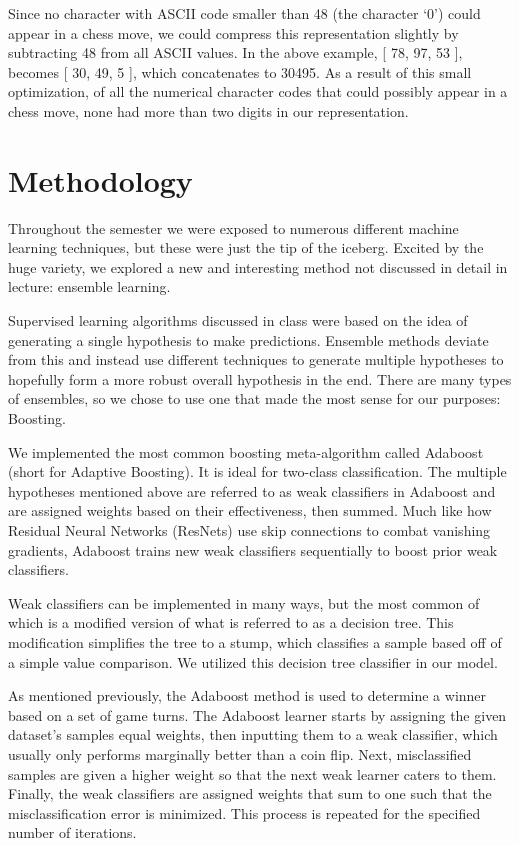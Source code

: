 \documentclass[]{interact}
\theoremstyle{plain}%
\theoremstyle{definition}
\theoremstyle{remark}
\begin{document}
Since no character with ASCII code smaller than 48 (the character ‘0’) could appear in a chess move, we could compress this representation slightly by subtracting 48 from all ASCII values. In the above example, [ 78, 97, 53 ], becomes [ 30, 49, 5 ], which concatenates to 30495. As a result of this small optimization, of all the numerical character codes that could possibly appear in a chess move, none had more than two digits in our representation.

\section{Methodology}

Throughout the semester we were exposed to numerous different machine learning techniques, but these were just the tip of the iceberg. Excited by the huge variety, we explored a new and interesting method not discussed in detail in lecture: ensemble learning.

Supervised learning algorithms discussed in class were based on the idea of generating a single hypothesis to make predictions. Ensemble methods deviate from this and instead use different techniques to generate multiple hypotheses to hopefully form a more robust overall hypothesis in the end. There are many types of ensembles, so we chose to use one that made the most sense for our purposes: Boosting.

We implemented the most common boosting meta-algorithm called Adaboost (short for Adaptive Boosting). It is ideal for two-class classification. The multiple hypotheses mentioned above are referred to as weak classifiers in Adaboost and are assigned weights based on their effectiveness, then summed. Much like how Residual Neural Networks (ResNets) use skip connections to combat vanishing gradients, Adaboost trains new weak classifiers sequentially to boost prior weak classifiers.

Weak classifiers can be implemented in many ways, but the most common of which is a modified version of what is referred to as a decision tree. This modification simplifies the tree to a stump, which classifies a sample based off of a simple value comparison. We utilized this decision tree classifier in our model.

As mentioned previously, the Adaboost method is used to determine a winner based on a set of game turns. The Adaboost learner starts by assigning the given dataset’s samples equal weights, then inputting them to a weak classifier, which usually only performs marginally better than a coin flip. Next, misclassified samples are given a higher weight so that the next weak learner caters to them. Finally, the weak classifiers are assigned weights that sum to one such that the misclassification error is minimized. This process is repeated for the specified number of iterations.
\end{document}
